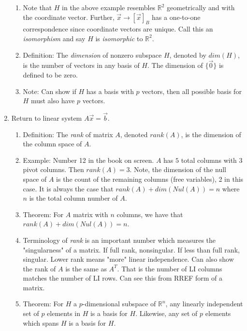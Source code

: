 \documentclass{article}
\begin{document}
\begin{enumerate}
\begin{enumerate}
\item Note that $H$ in the above example resembles $\mathbb{R}^2$ geometrically and with the coordinate vector. Further, $\vec{x} \rightarrow [ \vec{x} ]_B$ has a one-to-one correspondence since coordinate vectors are unique. Call this an \emph{isomorphism} and say $H$ is \emph{isomorphic} to $\mathbb{R}^2$.

\item Definition: The \emph{dimension} of nonzero subspace $H$, denoted by $dim(H)$, is the number of vectors in any basis of $H$. The dimension of $\{\vec{0}\}$ is defined to be zero.

\item Note: Can show if $H$ has a basis with $p$ vectors, then all possible basis for $H$ must also have $p$ vectors.
\end{enumerate}

\item Return to linear system $A\vec{x} = \vec{b}$. 
\begin{enumerate}

\item Definition: The \emph{rank} of matrix $A$, denoted $rank(A)$, is the dimension of the column space of $A$.

\item Example: Number 12 in the book on screen. $A$ has $5$ total columns with 3 pivot columns. Then $rank(A)=3$. Note, the dimension of the null space of $A$ is the count of the remaining columns (free variables), 2 in this case. It is always the case that $rank(A)+dim(Nul(A))=n$ where $n$ is the total column number of $A$.

\item Theorem: For $A$ matrix with $n$ columns, we have that $rank(A)+dim(Nul(A)) = n$.

\item Terminology of \emph{rank} is an important number which measures the "singularness" of a matrix. If full rank, nonsingular. If less than full rank, singular. Lower rank means "more" linear independence. Can also show the rank of $A$ is the same as $A^T$. That is the number of LI columns matches the number of LI rows. Can see this from RREF form of a matrix.

\item Theorem: For $H$ a $p$-dimensional subspace of $\mathbb{R}^n$, any linearly independent set of $p$ elements in $H$ is a basis for $H$. Likewise, any set of $p$ elements which spans $H$ is a basis for $H$.
\end{enumerate}



\end{enumerate}
\end{document}
